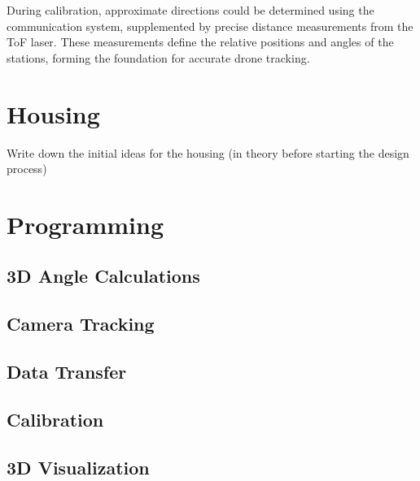 During calibration, approximate directions could be determined using the communication system, supplemented by precise distance measurements from the ToF laser. These measurements define the relative positions and angles of the stations, forming the foundation for accurate drone tracking.


\section{Housing}

Write down the initial ideas for the housing (in theory before starting the design process)


\section{Programming}

\subsection{3D Angle Calculations}

\subsection{Camera Tracking}

\subsection{Data Transfer}

\subsection{Calibration}

\subsection{3D Visualization}
